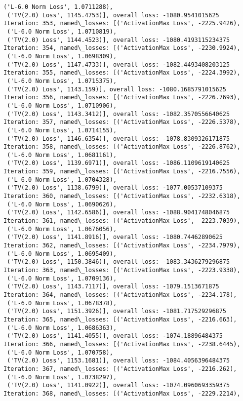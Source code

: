 \documentclass[10pt]{article}
\begin{document}
\begin{Verbatim}[commandchars=\\\{\}]
 ('L-6.0 Norm Loss', 1.0711288),
 ('TV(2.0) Loss', 1145.4753)], overall loss: -1080.9541015625
Iteration: 353, named\_losses: [('ActivationMax Loss', -2225.9426),
 ('L-6.0 Norm Loss', 1.0710819),
 ('TV(2.0) Loss', 1144.4523)], overall loss: -1080.4193115234375
Iteration: 354, named\_losses: [('ActivationMax Loss', -2230.9924),
 ('L-6.0 Norm Loss', 1.0698309),
 ('TV(2.0) Loss', 1147.4733)], overall loss: -1082.4493408203125
Iteration: 355, named\_losses: [('ActivationMax Loss', -2224.3992),
 ('L-6.0 Norm Loss', 1.0715375),
 ('TV(2.0) Loss', 1143.159)], overall loss: -1080.1685791015625
Iteration: 356, named\_losses: [('ActivationMax Loss', -2226.7693),
 ('L-6.0 Norm Loss', 1.0710906),
 ('TV(2.0) Loss', 1143.3412)], overall loss: -1082.3570556640625
Iteration: 357, named\_losses: [('ActivationMax Loss', -2226.5378),
 ('L-6.0 Norm Loss', 1.0714155),
 ('TV(2.0) Loss', 1146.6354)], overall loss: -1078.8309326171875
Iteration: 358, named\_losses: [('ActivationMax Loss', -2226.8762),
 ('L-6.0 Norm Loss', 1.0681161),
 ('TV(2.0) Loss', 1139.6971)], overall loss: -1086.1109619140625
Iteration: 359, named\_losses: [('ActivationMax Loss', -2216.7556),
 ('L-6.0 Norm Loss', 1.0704328),
 ('TV(2.0) Loss', 1138.6799)], overall loss: -1077.00537109375
Iteration: 360, named\_losses: [('ActivationMax Loss', -2232.6318),
 ('L-6.0 Norm Loss', 1.0690626),
 ('TV(2.0) Loss', 1142.6586)], overall loss: -1088.9041748046875
Iteration: 361, named\_losses: [('ActivationMax Loss', -2223.7039),
 ('L-6.0 Norm Loss', 1.0676056),
 ('TV(2.0) Loss', 1141.8916)], overall loss: -1080.74462890625
Iteration: 362, named\_losses: [('ActivationMax Loss', -2234.7979),
 ('L-6.0 Norm Loss', 1.0695409),
 ('TV(2.0) Loss', 1150.3846)], overall loss: -1083.3436279296875
Iteration: 363, named\_losses: [('ActivationMax Loss', -2223.9338),
 ('L-6.0 Norm Loss', 1.0709136),
 ('TV(2.0) Loss', 1143.7117)], overall loss: -1079.1513671875
Iteration: 364, named\_losses: [('ActivationMax Loss', -2234.178),
 ('L-6.0 Norm Loss', 1.0678378),
 ('TV(2.0) Loss', 1151.3926)], overall loss: -1081.717529296875
Iteration: 365, named\_losses: [('ActivationMax Loss', -2216.663),
 ('L-6.0 Norm Loss', 1.0686363),
 ('TV(2.0) Loss', 1141.4055)], overall loss: -1074.18896484375
Iteration: 366, named\_losses: [('ActivationMax Loss', -2238.6445),
 ('L-6.0 Norm Loss', 1.070758),
 ('TV(2.0) Loss', 1153.1681)], overall loss: -1084.4056396484375
Iteration: 367, named\_losses: [('ActivationMax Loss', -2216.262),
 ('L-6.0 Norm Loss', 1.0738297),
 ('TV(2.0) Loss', 1141.0922)], overall loss: -1074.0960693359375
Iteration: 368, named\_losses: [('ActivationMax Loss', -2229.2214),

\end{Verbatim}
\end{document}
